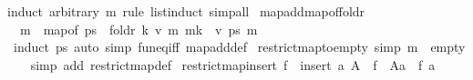 \begin{isabellebody}
{\isacharparenleft}{\kern0pt}induct\ arbitrary{\isacharcolon}{\kern0pt}\ m\ rule{\isacharcolon}{\kern0pt}\ list{\isacharunderscore}{\kern0pt}induct{}{\isacharparenright}{\kern0pt}\ simp{\isacharunderscore}{\kern0pt}all\isanewline
{}\isamarkupfalse%
%
\endisatagproof
{\isafoldproof}%
%
\isadelimproof
\isanewline
%
\endisadelimproof
\isanewline
{}\isamarkupfalse%
\ map{\isacharunderscore}{\kern0pt}add{\isacharunderscore}{\kern0pt}map{\isacharunderscore}{\kern0pt}of{\isacharunderscore}{\kern0pt}foldr{\isacharcolon}{\kern0pt}\isanewline
\ \ {\isachardoublequoteopen}m\ {\isacharplus}{\kern0pt}{\isacharplus}{\kern0pt}\ map{\isacharunderscore}{\kern0pt}of\ ps\ {\isacharequal}{\kern0pt}\ foldr\ {\isacharparenleft}{\kern0pt}{\isasymlambda}{\isacharparenleft}{\kern0pt}k{\isacharcomma}{\kern0pt}\ v{\isacharparenright}{\kern0pt}\ m{\isachardot}{\kern0pt}\ m{\isacharparenleft}{\kern0pt}k\ {\isasymmapsto}\ v{\isacharparenright}{\kern0pt}{\isacharparenright}{\kern0pt}\ ps\ m{\isachardoublequoteclose}\isanewline
%
\isadelimproof
\ \ %
\endisadelimproof
%
\isatagproof
{}\isamarkupfalse%
\ {\isacharparenleft}{\kern0pt}induct\ ps{\isacharparenright}{\kern0pt}\ {\isacharparenleft}{\kern0pt}auto\ simp{\isacharcolon}{\kern0pt}\ fun{\isacharunderscore}{\kern0pt}eq{\isacharunderscore}{\kern0pt}iff\ map{\isacharunderscore}{\kern0pt}add{\isacharunderscore}{\kern0pt}def{\isacharparenright}{\kern0pt}%
\endisatagproof
{\isafoldproof}%
%
\isadelimproof
%
\endisadelimproof
%
\isadelimdocument
%
\endisadelimdocument
%
\isatagdocument
%
\isamarkuptrue%
%
\endisatagdocument
{\isafolddocument}%
%
\isadelimdocument
%
\endisadelimdocument
{}\isamarkupfalse%
\ restrict{\isacharunderscore}{\kern0pt}map{\isacharunderscore}{\kern0pt}to{\isacharunderscore}{\kern0pt}empty\ {\isacharbrackleft}{\kern0pt}simp{\isacharbrackright}{\kern0pt}{\isacharcolon}{\kern0pt}\ {\isachardoublequoteopen}m{\isacharbar}{\kern0pt}{\isacharbackquote}{\kern0pt}{\isacharbraceleft}{\kern0pt}{\isacharbraceright}{\kern0pt}\ {\isacharequal}{\kern0pt}\ empty{\isachardoublequoteclose}\isanewline
%
\isadelimproof
\ \ %
\endisadelimproof
%
\isatagproof
{}\isamarkupfalse%
\ {\isacharparenleft}{\kern0pt}simp\ add{\isacharcolon}{\kern0pt}\ restrict{\isacharunderscore}{\kern0pt}map{\isacharunderscore}{\kern0pt}def{\isacharparenright}{\kern0pt}%
\endisatagproof
{\isafoldproof}%
%
\isadelimproof
\isanewline
%
\endisadelimproof
\isanewline
{}\isamarkupfalse%
\ restrict{\isacharunderscore}{\kern0pt}map{\isacharunderscore}{\kern0pt}insert{\isacharcolon}{\kern0pt}\ {\isachardoublequoteopen}f\ {\isacharbar}{\kern0pt}{\isacharbackquote}{\kern0pt}\ {\isacharparenleft}{\kern0pt}insert\ a\ A{\isacharparenright}{\kern0pt}\ {\isacharequal}{\kern0pt}\ {\isacharparenleft}{\kern0pt}f\ {\isacharbar}{\kern0pt}{\isacharbackquote}{\kern0pt}\ A{\isacharparenright}{\kern0pt}{\isacharparenleft}{\kern0pt}a\ {\isacharcolon}{\kern0pt}{\isacharequal}{\kern0pt}\ f\ a{\isacharparenright}{\kern0pt}{\isachardoublequoteclose}\isanewline

\end{isabellebody}
